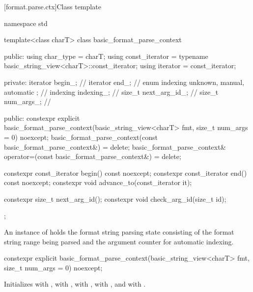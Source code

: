 [format.parse.ctx]{Class template }

%
%
%
%
\begin{codeblock}
namespace std {
  template<class charT>
  class basic_format_parse_context {
  public:
    using char_type = charT;
    using const_iterator = typename basic_string_view<charT>::const_iterator;
    using iterator = const_iterator;

  private:
    iterator begin_;                                    // \expos
    iterator end_;                                      // \expos
    enum indexing { unknown, manual, automatic };       // \expos
    indexing indexing_;                                 // \expos
    size_t next_arg_id_;                                // \expos
    size_t num_args_;                                   // \expos

  public:
    constexpr explicit basic_format_parse_context(basic_string_view<charT> fmt,
                                                  size_t num_args = 0) noexcept;
    basic_format_parse_context(const basic_format_parse_context&) = delete;
    basic_format_parse_context& operator=(const basic_format_parse_context&) = delete;

    constexpr const_iterator begin() const noexcept;
    constexpr const_iterator end() const noexcept;
    constexpr void advance_to(const_iterator it);

    constexpr size_t next_arg_id();
    constexpr void check_arg_id(size_t id);
  };
}
\end{codeblock}

\pnum
An instance of  holds
the format string parsing state consisting of
the format string range being parsed and
the argument counter for automatic indexing.

%
\begin{itemdecl}
constexpr explicit basic_format_parse_context(basic_string_view<charT> fmt,
                                              size_t num_args = 0) noexcept;
\end{itemdecl}

\begin{itemdescr}
\pnum
\effects
Initializes
 with ,
 with ,
 with ,
 with , and
 with .
\end{itemdescr}

